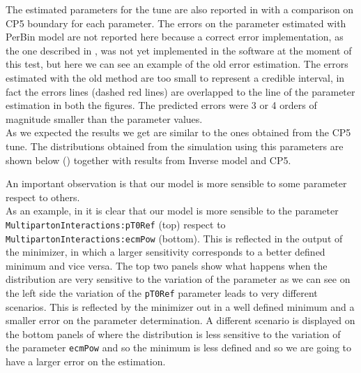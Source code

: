 \noindent The estimated parameters for the tune are also reported in  with a comparison on CP5 boundary for each parameter. The errors on the parameter estimated with PerBin model are not reported here because a correct error implementation, as the one described in , was not yet implemented in the software at the moment of this test, but here we can see an example of the old error estimation. The errors estimated with the old method are too small to represent a credible interval, in fact the errors lines (dashed red lines) are overlapped to the line of the parameter estimation in both the figures. The predicted errors were 3 or 4 orders of magnitude smaller than the parameter values. 
\\
As we expected the results we get are similar to the ones obtained from the CP5 tune. The distributions obtained from the simulation using this parameters are shown below () together with results from Inverse model and CP5.


\medskip

An important observation is that our model is more sensible to some parameter respect to others.
\\
As an example, in  it is clear that our model is more sensible to the parameter \texttt{MultipartonInteractions:pT0Ref} (top) respect to 
\texttt{MultipartonInteractions:}\-\texttt{ecmPow} (bottom). This is reflected in the output of the minimizer, in which a larger sensitivity corresponds to a better defined minimum and vice versa. The top two panels show what happens when the distribution are very sensitive to the variation of the parameter as we can see on the left side the variation of the \texttt{pT0Ref} parameter leads to very different scenarios. This is reflected by the minimizer out in a well defined minimum and a smaller error on the parameter determination. A different scenario is displayed on the bottom panels of  where the distribution is less sensitive to the variation of the parameter \texttt{ecmPow} and so the minimum is less defined and so we are going to have a larger error on the estimation.

